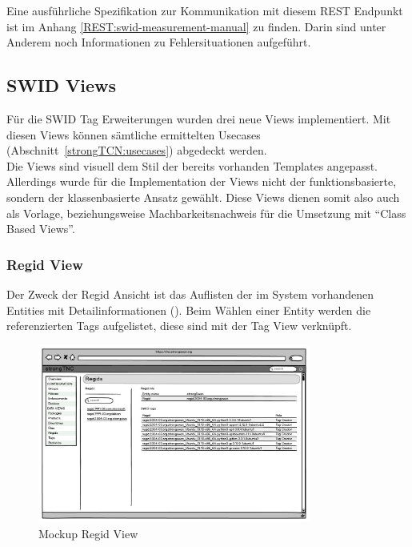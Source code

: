 
Eine ausführliche Spezifikation zur Kommunikation mit diesem REST Endpunkt ist
im Anhang \autoref{REST:swid-measurement-manual} zu finden. Darin sind unter
Anderem noch Informationen zu Fehlersituationen aufgeführt.


\subsection{SWID Views}
Für die SWID Tag Erweiterungen wurden drei neue Views implementiert. Mit diesen
Views können sämtliche ermittelten Usecases (Abschnitt~\ref{strongTCN:usecases})
abgedeckt werden.\\
Die Views sind visuell dem Stil der bereits vorhanden Templates angepasst.
Allerdings wurde für die Implementation der Views nicht der funktionsbasierte,
sondern der klassenbasierte Ansatz gewählt. Diese Views dienen somit also auch als
Vorlage, beziehungsweise Machbarkeitsnachweis für die Umsetzung mit
\enquote{Class Based Views}.


\subsubsection{Regid View}
Der Zweck der Regid Ansicht ist das Auflisten der im System vorhandenen Entities
mit Detailinformationen (). Beim Wählen einer Entity
werden die referenzierten Tags aufgelistet, diese sind mit der Tag View
verknüpft.

\begin{figure}[H]
	\centering
	\includegraphics[width=0.8\textwidth]{./images/mockups/swid-regid-view}
	\caption{Mockup Regid View}
	\label{fig:regid-view-mockup}
\end{figure}


